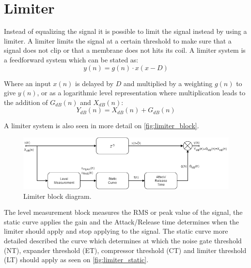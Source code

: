 \section{Limiter}
Instead of equalizing the signal it is possible to limit the signal instead by using a limiter. A limiter limits the signal at a certain threshold to make sure that a signal does not clip or that a membrane does not hits its coil. A limiter system is a feedforward system which can be stated as:
\begin{equation}
y(n) = g(n)\cdot x(x-D)
\end{equation}

%  
Where an input $x(n)$ is delayed by $D$ and multiplied by a weighting $g(n)$ to give $y(n)$, or as a logarithmic level representation where multiplication leads to the addition of $G_{dB}(n)$ and $X_{dB}(n)$:
\begin{equation}
Y_{dB}(n) = X_{dB}(n) + G_{dB}(n)
\end{equation}

A limiter system is also seen in more detail on \autoref{fig:limiter_block}.

\begin{figure}[H]
\centering
\includegraphics[width=1\textwidth]{figures/Limiter_block.png}
\caption{Limiter block diagram.}
\label{fig:limiter_block}
\end{figure}   


The level measurement block measures the RMS or peak value of the signal, the static curve applies the gain and the Attack/Release time determines when the limiter should apply and stop applying to the signal. The static curve more detailed described the curve which determines at which the noise gate threshold (NT), expander threshold (ET), compressor threshold (CT) and limiter threshold (LT) should apply as seen on \autoref{fig:limiter_static}. 

